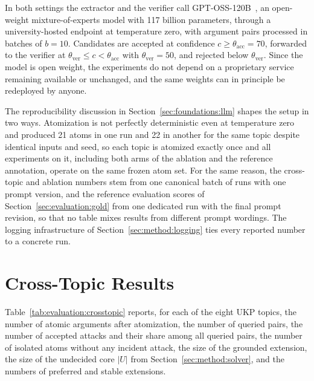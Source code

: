 In both settings the extractor and the verifier call
GPT-OSS-120B~\cite{gptoss2025}, an open-weight mixture-of-experts model with
117 billion parameters, through a university-hosted endpoint at temperature
zero, with argument pairs processed in batches of $b = 10$. Candidates are accepted at
confidence $c \geq \theta_{\text{acc}} = 70$, forwarded to the verifier at
$\theta_{\text{ver}} \leq c < \theta_{\text{acc}}$ with
$\theta_{\text{ver}} = 50$, and rejected below $\theta_{\text{ver}}$. Since
the model is open weight, the experiments do not depend on a proprietary
service remaining available or unchanged, and the same weights can in
principle be redeployed by anyone.

The reproducibility discussion in Section~\ref{sec:foundations:llm} shapes
the setup in two ways. Atomization is not perfectly deterministic even at
temperature zero and produced 21 atoms in one run and 22 in another for the
same topic despite identical inputs and seed, so each topic is atomized
exactly once and all experiments on it, including both arms of the ablation
and the reference annotation, operate on the same frozen atom set. For the same
reason, the cross-topic and ablation numbers stem from one canonical batch of
runs with one prompt version, and the reference evaluation scores of
Section~\ref{sec:evaluation:gold} from one dedicated run with the final
prompt revision, so that no table mixes results from different prompt
wordings. The logging infrastructure of Section~\ref{sec:method:logging}
ties every reported number to a concrete run.

\section{Cross-Topic Results}
\label{sec:evaluation:crosstopic}

Table~\ref{tab:evaluation:crosstopic} reports, for each of the eight UKP topics,
the number of atomic arguments after atomization, the number of queried pairs,
the number of accepted attacks and their share among all queried pairs, the
number of isolated atoms without any incident attack, the size of the grounded
extension, the size of the undecided core $|U|$ from
Section~\ref{sec:method:solver}, and the numbers of preferred and stable
extensions.

\begin{table}[tb]
  \centering
  \caption{Cross-topic results over the eight UKP topics. ``Atoms'' is the
  number of atomic arguments after atomization, and ``Pairs'' is the number of
  queried pairs, excluding pairs of atoms that stem from the same source
  argument. ``Acc'' is the number
  of accepted attacks, that is the edges of the framework, and ``Acc\%'' is
  their share among all queried pairs. ``Iso'' counts atoms without incident
  attacks, ``Grnd'' is the size of the grounded extension, $|U|$ the size of
  the undecided core, and \#Pr and \#St the numbers of preferred and stable
  extensions.}
  \label{tab:evaluation:crosstopic}
  \small
  
\end{table}


